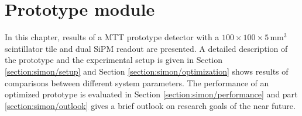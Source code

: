 \newcommand{\image}[4][!htb]{
  \begin{figure}[#1]
    \centering
    \texttt{[image: \#3]}
    \caption{#4}
    \label{image:#3}
  \end{figure}
}
%
\newcommand{\doubleimage}[9][!htb]{
  \begin{figure}[#1]
    \centering
    \subfloat[#4]{\texttt{[image: \#3]}}
    \hspace{#9}
    \subfloat[#7]{\texttt{[image: \#6]}}
    \caption{#8}
    \label{image:#3}
  \end{figure}
}
%
\newpage
\section{Prototype module}
\label{section:simon}
In this chapter, results of a MTT prototype detector with a $100 \times 100 \times 5 \,\text{mm}^3$ scintillator tile and dual SiPM readout are presented. A detailed description of the prototype and the experimental setup is given in Section \ref{section:simon/setup} and Section \ref{section:simon/optimization} shows results of comparisons between different system parameters. The performance of an optimized prototype is evaluated in Section \ref{section:simon/performance} and part \ref{section:simon/outlook} gives a brief outlook on research goals of the near future.
%



